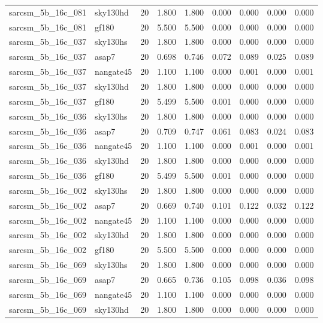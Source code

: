 \begin{tabular}{llrrrrrrr}
sarcsm\_5b\_16c\_081 & sky130hd & 20 & 1.800 & 1.800 & 0.000 & 0.000 & 0.000 & 0.000 \\
sarcsm\_5b\_16c\_081 & gf180 & 20 & 5.500 & 5.500 & 0.000 & 0.000 & 0.000 & 0.000 \\
sarcsm\_5b\_16c\_037 & sky130hs & 20 & 1.800 & 1.800 & 0.000 & 0.000 & 0.000 & 0.000 \\
sarcsm\_5b\_16c\_037 & asap7 & 20 & 0.698 & 0.746 & 0.072 & 0.089 & 0.025 & 0.089 \\
sarcsm\_5b\_16c\_037 & nangate45 & 20 & 1.100 & 1.100 & 0.000 & 0.001 & 0.000 & 0.001 \\
sarcsm\_5b\_16c\_037 & sky130hd & 20 & 1.800 & 1.800 & 0.000 & 0.000 & 0.000 & 0.000 \\
sarcsm\_5b\_16c\_037 & gf180 & 20 & 5.499 & 5.500 & 0.001 & 0.000 & 0.000 & 0.000 \\
sarcsm\_5b\_16c\_036 & sky130hs & 20 & 1.800 & 1.800 & 0.000 & 0.000 & 0.000 & 0.000 \\
sarcsm\_5b\_16c\_036 & asap7 & 20 & 0.709 & 0.747 & 0.061 & 0.083 & 0.024 & 0.083 \\
sarcsm\_5b\_16c\_036 & nangate45 & 20 & 1.100 & 1.100 & 0.000 & 0.001 & 0.000 & 0.001 \\
sarcsm\_5b\_16c\_036 & sky130hd & 20 & 1.800 & 1.800 & 0.000 & 0.000 & 0.000 & 0.000 \\
sarcsm\_5b\_16c\_036 & gf180 & 20 & 5.499 & 5.500 & 0.001 & 0.000 & 0.000 & 0.000 \\
sarcsm\_5b\_16c\_002 & sky130hs & 20 & 1.800 & 1.800 & 0.000 & 0.000 & 0.000 & 0.000 \\
sarcsm\_5b\_16c\_002 & asap7 & 20 & 0.669 & 0.740 & 0.101 & 0.122 & 0.032 & 0.122 \\
sarcsm\_5b\_16c\_002 & nangate45 & 20 & 1.100 & 1.100 & 0.000 & 0.000 & 0.000 & 0.000 \\
sarcsm\_5b\_16c\_002 & sky130hd & 20 & 1.800 & 1.800 & 0.000 & 0.000 & 0.000 & 0.000 \\
sarcsm\_5b\_16c\_002 & gf180 & 20 & 5.500 & 5.500 & 0.000 & 0.000 & 0.000 & 0.000 \\
sarcsm\_5b\_16c\_069 & sky130hs & 20 & 1.800 & 1.800 & 0.000 & 0.000 & 0.000 & 0.000 \\
sarcsm\_5b\_16c\_069 & asap7 & 20 & 0.665 & 0.736 & 0.105 & 0.098 & 0.036 & 0.098 \\
sarcsm\_5b\_16c\_069 & nangate45 & 20 & 1.100 & 1.100 & 0.000 & 0.000 & 0.000 & 0.000 \\
sarcsm\_5b\_16c\_069 & sky130hd & 20 & 1.800 & 1.800 & 0.000 & 0.000 & 0.000 & 0.000 \\

\end{tabular}
